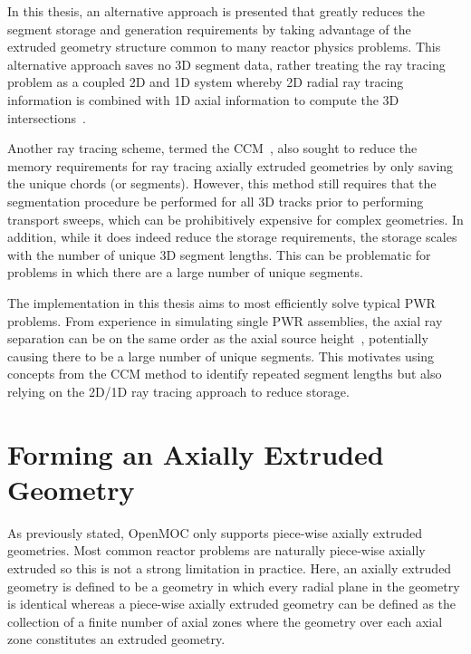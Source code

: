 In this thesis, an alternative approach is presented that greatly reduces the segment storage and generation requirements by taking advantage of the extruded geometry structure common to many reactor physics problems. This alternative approach saves no 3D segment data, rather treating the ray tracing problem as a coupled 2D and 1D system whereby 2D radial ray tracing information is combined with 1D axial information to compute the 3D intersections~\cite{physor2016otf}.

Another ray tracing scheme, termed the \ac{CCM}~\cite{Sciannandrone2016}, also sought to reduce the memory requirements for ray tracing axially extruded geometries by only saving the unique chords (or segments).  However, this method still requires that the segmentation procedure be performed for all 3D tracks prior to performing transport sweeps, which can be prohibitively expensive for complex geometries. In addition, while it does indeed reduce the storage requirements, the storage scales with the number of unique 3D segment lengths. This can be problematic for problems in which there are a large number of unique segments. 


The implementation in this thesis aims to most efficiently solve typical \ac{PWR} problems. From experience in simulating single \ac{PWR} assemblies, the axial ray separation can be on the same order as the axial source height~\cite{openmoc-beavrs}, potentially causing there to be a large number of unique segments. This motivates using concepts from the \ac{CCM} method to identify repeated segment lengths but also relying on the 2D/1D ray tracing approach to reduce storage.

\section{Forming an Axially Extruded Geometry}
\label{sec:ax-extruded}

As previously stated, OpenMOC only supports piece-wise axially extruded geometries. Most common reactor problems are naturally piece-wise axially extruded so this is not a strong limitation in practice. Here, an axially extruded geometry is defined to be a geometry in which every radial plane in the geometry is identical whereas a piece-wise axially extruded geometry can be defined as the collection of a finite number of axial zones where the geometry over each axial zone constitutes an extruded geometry. 

